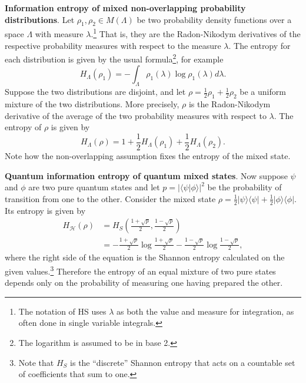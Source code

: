 \documentclass[10pt,twocolumn, nofootinbib]{revtex4-2}
\begin{document}
\textbf{Information entropy of mixed non-overlapping probability distributions}. Let $\rho_1, \rho_2 \in M(\Lambda)$ be two probability density functions over a space $\Lambda$ with measure $\lambda$.\footnote{The notation of HS uses $\lambda$ as both the value and measure for integration, as often done in single variable integrals.} That is, they are the Radon-Nikodym derivatives of the respective probability measures with respect to the measure $\lambda$. The entropy for each distribution is given by the usual formula\footnote{The logarithm is assumed to be in base 2.}, for example
\begin{equation}\label{shannon_entropy}
	H_\Lambda(\rho_1) = - \int_\Lambda \rho_1(\lambda) \log \rho_1(\lambda) d\lambda.
\end{equation}
Suppose the two distributions are disjoint, and let $\rho = \frac{1}{2} \rho_1 + \frac{1}{2} \rho_2$ be a uniform mixture of the two distributions. More precisely, $\rho$ is the Radon-Nikodym derivative of the average of the two probability measures with respect to $\lambda$. The entropy of $\rho$ is given by
\begin{equation}\label{entropy_nonoverlap}
	H_\Lambda(\rho) = 1 + \frac{1}{2} H_\Lambda(\rho_1) + \frac{1}{2} H_\Lambda(\rho_2).
\end{equation}
Note how the non-overlapping assumption fixes the entropy of the mixed state. 

\textbf{Quantum information entropy of quantum mixed states}. Now suppose $\psi$ and $\phi$ are two pure quantum states and let $p = | \langle \psi | \phi \rangle |^2$ be the probability of transition from one to the other. Consider the mixed state $\rho = \frac{1}{2} | \psi \rangle \langle \psi | + \frac{1}{2} | \phi \rangle \langle \phi |$. Its entropy is given by
\begin{equation}\label{entropy_mixed}
	\begin{aligned}
	H_\mathcal{H}(\rho) &= H_S\left(\frac{1+\sqrt{p}}{2}, \frac{1-\sqrt{p}}{2}\right) \\
	&= - \frac{1+\sqrt{p}}{2} \log \frac{1+\sqrt{p}}{2} - \frac{1-\sqrt{p}}{2} \log \frac{1-\sqrt{p}}{2} ,
	\end{aligned}
\end{equation}
where the right side of the equation is the Shannon entropy calculated on the given values.\footnote{Note that $H_S$ is the ``discrete'' Shannon entropy that acts on a countable set of coefficients that sum to one.} Therefore the entropy of an equal mixture of two pure states depends only on the probability of measuring one having prepared the other.
\end{document}
